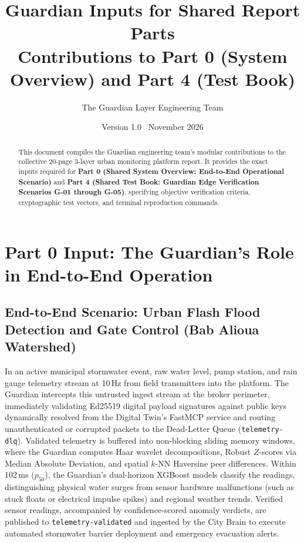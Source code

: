 \documentclass[11pt,a4paper]{article}
\title{\sffamily\bfseries\huge Guardian Inputs for Shared Report Parts\\[0.3em]
\Large Contributions to Part 0 (System Overview) and Part 4 (Test Book)}
\author{\textsf{The Guardian Layer Engineering Team}}
\date{\textsf{Version 1.0 \textbar\ November 2026}}
\begin{document}
\maketitle
\thispagestyle{fancy}

\begin{abstract}
\noindent This document compiles the Guardian engineering team's modular contributions to the collective 20-page 3-layer urban monitoring platform report. It provides the exact inputs required for \textbf{Part 0 (Shared System Overview: End-to-End Operational Scenario)} and \textbf{Part 4 (Shared Test Book: Guardian Edge Verification Scenarios G-01 through G-05)}, specifying objective verification criteria, cryptographic test vectors, and terminal reproduction commands.
\end{abstract}

\vspace{0.5cm}

\section{Part 0 Input: The Guardian's Role in End-to-End Operation}

\subsection{End-to-End Scenario: Urban Flash Flood Detection and Gate Control (Bab Alioua Watershed)}

In an active municipal stormwater event, raw water level, pump station, and rain gauge telemetry stream at 10\,Hz from field transmitters into the platform. The Guardian intercepts this untrusted ingest stream at the broker perimeter, immediately validating Ed25519 digital payload signatures against public keys dynamically resolved from the Digital Twin's FastMCP service and routing unauthenticated or corrupted packets to the Dead-Letter Queue (\texttt{telemetry-dlq}). Validated telemetry is buffered into non-blocking sliding memory windows, where the Guardian computes Haar wavelet decompositions, Robust $Z$-scores via Median Absolute Deviation, and spatial $k$-NN Haversine peer differences. Within 102\,ms ($p_{50}$), the Guardian's dual-horizon XGBoost models classify the readings, distinguishing physical water surges from sensor hardware malfunctions (such as stuck floats or electrical impulse spikes) and regional weather trends. Verified sensor readings, accompanied by confidence-scored anomaly verdicts, are published to \texttt{telemetry-validated} and ingested by the City Brain to execute automated stormwater barrier deployment and emergency evacuation alerts.
\end{document}
